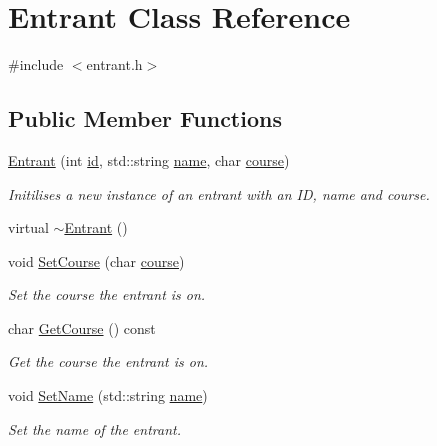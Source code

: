 \hypertarget{classEntrant}{\section{\-Entrant \-Class \-Reference}
\label{classEntrant}
}


{\ttfamily \#include $<$entrant.\-h$>$}

\subsection*{\-Public \-Member \-Functions}
\begin{DoxyCompactItemize}
\item 
\hyperlink{classEntrant_a05a5b4bb5abde50a940a43ae9aa91e1b}{\-Entrant} (int \hyperlink{classEntrant_a38e44f4d077b9570ce24e9bdcb5cd002}{id}, std\-::string \hyperlink{classEntrant_a1f90de1d03c5bf4fb5bf4fac2d437129}{name}, char \hyperlink{classEntrant_a6a07700d22efca127fb9fe9da2f6e8a6}{course})
\begin{DoxyCompactList}\small\item\em \-Initilises a new instance of an entrant with an \-I\-D, name and course. \end{DoxyCompactList}\item 
virtual \hyperlink{classEntrant_a6f4ee6350535b4e29feb685911babbd2}{$\sim$\-Entrant} ()
\item 
void \hyperlink{classEntrant_a948d4853a46f1871b938b086d7e3d299}{\-Set\-Course} (char \hyperlink{classEntrant_a6a07700d22efca127fb9fe9da2f6e8a6}{course})
\begin{DoxyCompactList}\small\item\em \-Set the course the entrant is on. \end{DoxyCompactList}\item 
char \hyperlink{classEntrant_a09bfff64f7d0cff04c7cbf4bc90be40f}{\-Get\-Course} () const 
\begin{DoxyCompactList}\small\item\em \-Get the course the entrant is on. \end{DoxyCompactList}\item 
void \hyperlink{classEntrant_aded5c26726ac5680d4d4c08de78d3b88}{\-Set\-Name} (std\-::string \hyperlink{classEntrant_a1f90de1d03c5bf4fb5bf4fac2d437129}{name})
\begin{DoxyCompactList}\small\item\em \-Set the name of the entrant. \end{DoxyCompactList}\item 

\end{DoxyCompactItemize}
